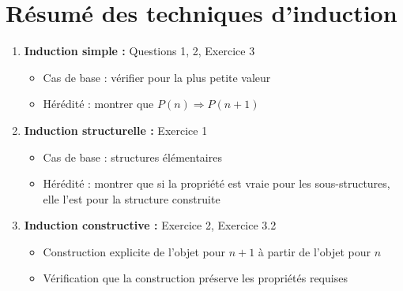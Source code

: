 \documentclass[12pt,a4paper]{article}
\begin{document}
\newpage
\section{Résumé des techniques d'induction}

\begin{tcolorbox}[colback=fondbleu,colframe=titrebleu,title=\textbf{Types d'induction utilisés}]

\begin{enumerate}
    \item \textbf{Induction simple :} Questions 1, 2, Exercice 3
    \begin{itemize}
        \item Cas de base : vérifier pour la plus petite valeur
        \item Hérédité : montrer que $P(n) \Rightarrow P(n+1)$
    \end{itemize}
    
    \item \textbf{Induction structurelle :} Exercice 1
    \begin{itemize}
        \item Cas de base : structures élémentaires
        \item Hérédité : montrer que si la propriété est vraie pour les sous-structures, elle l'est pour la structure construite
    \end{itemize}
    
    \item \textbf{Induction constructive :} Exercice 2, Exercice 3.2
    \begin{itemize}
        \item Construction explicite de l'objet pour $n+1$ à partir de l'objet pour $n$
        \item Vérification que la construction préserve les propriétés requises
    \end{itemize}
\end{enumerate}
\end{tcolorbox}
\end{document}
